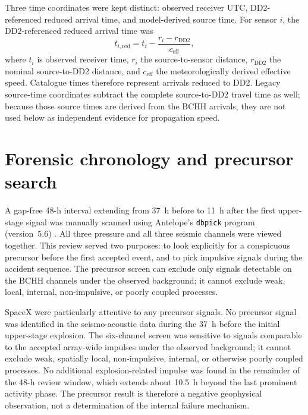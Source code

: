 \documentclass[]{seismica}
\begin{document}
Three time coordinates were kept distinct: observed receiver UTC,
DD2-referenced reduced arrival time, and model-derived source time. For sensor
$i$, the DD2-referenced reduced arrival time was
\begin{equation}
 t_{i,\mathrm{red}}=t_i-\frac{r_i-r_{\mathrm{DD2}}}{c_{\mathrm{eff}}},
 \label{eq:reduced_time}
\end{equation}
where $t_i$ is observed receiver time, $r_i$ the source-to-sensor distance,
$r_{\mathrm{DD2}}$ the nominal source-to-DD2 distance, and
$c_{\mathrm{eff}}$ the meteorologically derived effective speed. Catalogue
times therefore represent arrivals reduced to DD2. Legacy source-time
coordinates subtract the complete source-to-DD2 travel time as well; because
those source times are derived from the BCHH arrivals, they are not used below
as independent evidence for propagation speed.

\FloatBarrier


\section{Forensic chronology and precursor search}
\label{sec:precursor}

A gap-free 48-h interval extending from 37~h before to 11~h after the first
upper-stage signal was manually scanned using Antelope's \texttt{dbpick}
program (version~5.6) \citep{brtt_antelope}. All three pressure and all three
seismic channels were viewed together. This review served two purposes: to
look explicitly for a conspicuous precursor before the first accepted event,
and to pick impulsive signals during the accident sequence. The precursor
screen can exclude only signals detectable on the BCHH channels under the
observed background; it cannot exclude weak, local, internal, non-impulsive,
or poorly coupled processes.

SpaceX were particularly attentive to any precursor signals. No precursor
signal was identified in the seismo-acoustic data during the 37~h before the
initial upper-stage explosion. The six-channel screen was sensitive to signals
comparable to the accepted array-wide impulses under the observed background;
it cannot exclude weak, spatially local, non-impulsive, internal, or otherwise
poorly coupled processes. No additional explosion-related impulse was found in
the remainder of the 48-h review window, which extends about 10.5~h beyond the
last prominent activity phase. The precursor result is therefore a negative
geophysical observation, not a determination of the internal failure mechanism.
\end{document}
